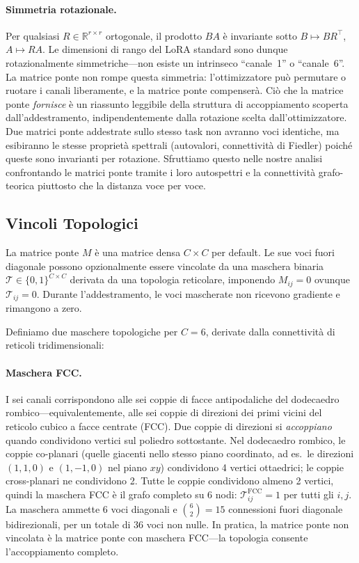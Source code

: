 \documentclass[11pt]{article}
\begin{document}
\paragraph{Simmetria rotazionale.}
Per qualsiasi $R \in \mathbb{R}^{r \times r}$ ortogonale, il prodotto
$BA$ \`e invariante sotto $B \mapsto BR^\top$, $A \mapsto RA$.
Le dimensioni di rango del LoRA standard sono dunque rotazionalmente
simmetriche---non esiste un intrinseco ``canale~1'' o ``canale~6''.
La matrice ponte non rompe questa simmetria: l'ottimizzatore pu\`o
permutare o ruotare i canali liberamente, e la matrice ponte
compenser\`a.
Ci\`o che la matrice ponte \emph{fornisce} \`e un riassunto leggibile
della struttura di accoppiamento scoperta dall'addestramento,
indipendentemente dalla rotazione scelta dall'ottimizzatore.
Due matrici ponte addestrate sullo stesso task non avranno voci
identiche, ma esibiranno le stesse propriet\`a spettrali (autovalori,
connettivit\`a di Fiedler) poich\'e queste sono invarianti per
rotazione.
Sfruttiamo questo nelle nostre analisi confrontando le matrici ponte
tramite i loro autospettri e la connettivit\`a grafo-teorica piuttosto
che la distanza voce per voce.

\subsection{Vincoli Topologici}
\label{sec:topology}

La matrice ponte $M$ \`e una matrice densa $C \times C$ per default.
Le sue voci fuori diagonale possono opzionalmente essere vincolate da
una maschera binaria $\mathcal{T} \in \{0, 1\}^{C \times C}$ derivata
da una topologia reticolare, imponendo $M_{ij} = 0$ ovunque
$\mathcal{T}_{ij} = 0$.
Durante l'addestramento, le voci mascherate non ricevono gradiente e
rimangono a zero.

Definiamo due maschere topologiche per $C = 6$, derivate dalla
connettivit\`a di reticoli tridimensionali:

\paragraph{Maschera FCC.}
I sei canali corrispondono alle sei coppie di facce antipodaliche del
dodecaedro rombico---equivalentemente, alle sei coppie di direzioni dei
primi vicini del reticolo cubico a facce centrate (FCC).
Due coppie di direzioni si \emph{accoppiano} quando condividono vertici
sul poliedro sottostante.
Nel dodecaedro rombico, le coppie co-planari (quelle giacenti nello
stesso piano coordinato, ad es.\ le direzioni $(1,1,0)$ e $(1,-1,0)$ nel
piano $xy$) condividono 4 vertici ottaedrici; le coppie cross-planari
ne condividono 2.
Tutte le coppie condividono almeno 2 vertici, quindi la maschera FCC \`e
il grafo completo su 6 nodi: $\mathcal{T}^\text{FCC}_{ij} = 1$ per
tutti gli $i, j$.
La maschera ammette 6 voci diagonali e $\binom{6}{2} = 15$ connessioni
fuori diagonale bidirezionali, per un totale di 36 voci non nulle.
In pratica, la matrice ponte non vincolata \`e la matrice ponte con
maschera FCC---la topologia consente l'accoppiamento completo.
\end{document}
